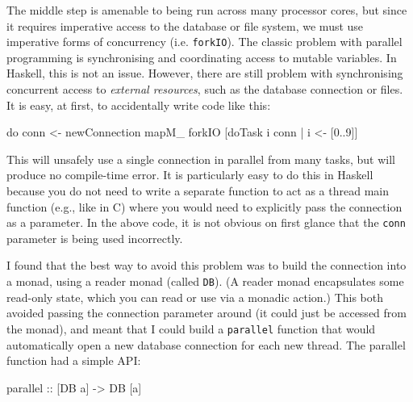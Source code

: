 \documentclass{tmr}
\begin{document}
The middle step is amenable to being run across many processor cores, but since it requires imperative access to the database or file system, we must use imperative forms of concurrency (i.e. \lstinline|forkIO|).  The classic problem with parallel programming is synchronising and coordinating access to mutable variables.  In Haskell, this is not an issue.   However, there are still problem with synchronising concurrent access to \textit{external resources}, such as the database connection or files.  It is easy, at first, to accidentally write code like this:

\begin{code}
do conn <- newConnection
   mapM_ forkIO [doTask i conn | i <- [0..9]]
\end{code}

This will unsafely use a single connection in parallel from many tasks, but will produce no compile-time error.  It is particularly easy to do this in Haskell because you do not need to write a separate function to act as a thread main function (e.g., like in C) where you would need to explicitly pass the connection as a parameter.  In the above code, it is not obvious on first glance that the \lstinline|conn| parameter is being used incorrectly. 

I found that the best way to avoid this problem was to build the connection into a monad, using a reader monad (called \lstinline|DB|).  (A reader monad encapsulates some read-only state, which you can read or use via a monadic action.)  This both avoided passing the connection parameter around (it could just be accessed from the monad), and meant that I could build a \lstinline|parallel| function that would automatically open a new database connection for each new thread.  The parallel function had a simple API\@:

\begin{code}
parallel :: [DB a] -> DB [a]
\end{code}
\end{document}
